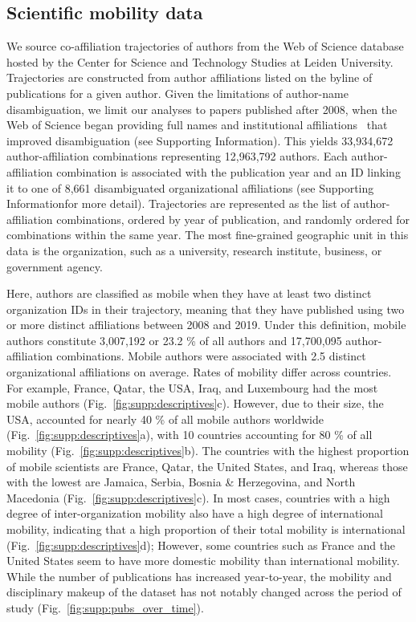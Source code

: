 \documentclass[12pt]{article} %
\def\SI{Supporting Information}
\begin{document}
\subsection*{Scientific mobility data}
We source co-affiliation trajectories of authors from the Web of Science database hosted by the Center for Science and Technology Studies at Leiden University.
Trajectories are constructed from author affiliations listed on the byline of publications for a given author.
Given the limitations of author-name disambiguation, we limit our analyses to papers published after 2008, when the Web of Science began providing full names and institutional affiliations~\autocite{caron2014disambiguation} that improved disambiguation (see \SI).
This yields 33,934,672 author-affiliation combinations representing 12,963,792 authors.
Each author-affiliation combination is associated with the publication year and an ID linking it to one of 8,661 disambiguated organizational affiliations (see \SI for more detail).
Trajectories are represented as the list of author-affiliation combinations, ordered by year of publication, and randomly ordered for combinations within the same year. The most fine-grained geographic unit in this data is the organization, such as a university, research institute, business, or government agency.

Here, authors are classified as mobile when they have at least two distinct organization IDs in their trajectory, meaning that they have published using two or more distinct affiliations between 2008 and 2019.
Under this definition, mobile authors constitute 3,007,192 or 23.2 \% of all authors and 17,700,095 author-affiliation combinations.
Mobile authors were associated with 2.5 distinct organizational affiliations on average.
Rates of mobility differ across countries.
For example, France, Qatar, the USA, Iraq, and Luxembourg had the most mobile authors (Fig.~\ref{fig:supp:descriptives}c).
However, due to their size, the USA, accounted for nearly 40 \% of all mobile authors worldwide (Fig.~\ref{fig:supp:descriptives}a), with 10 countries accounting for 80 \% of all mobility (Fig.~\ref{fig:supp:descriptives}b).
The countries with the highest proportion of mobile scientists are France, Qatar, the United States, and Iraq, whereas those with the lowest are Jamaica, Serbia, Bosnia \& Herzegovina, and North Macedonia (Fig.~\ref{fig:supp:descriptives}c).
In most cases, countries with a high degree of inter-organization mobility also have a high degree of international mobility, indicating that a high proportion of their total mobility is international (Fig.~\ref{fig:supp:descriptives}d);
However, some countries such as France and the United States seem to have more domestic mobility than international mobility.
While the number of publications has increased year-to-year, the mobility and disciplinary makeup of the dataset has not notably changed across the period of study (Fig.~\ref{fig:supp:pubs_over_time}).
\end{document}
